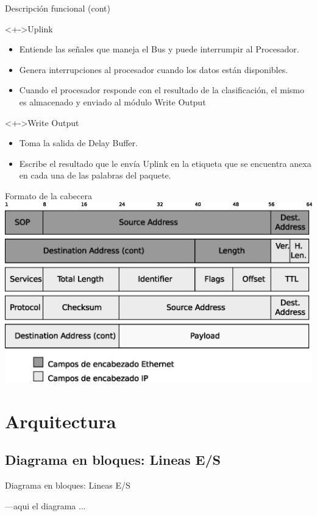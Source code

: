 \documentclass[xcolor=dvipsnames]{beamer}
\begin{document}
\begin{frame}{Descripción funcional (cont)}
  \begin{block}<+->{Uplink}   
    \begin{itemize}
      \scriptsize
     	\item Entiende las señales que maneja el Bus y puede interrumpir al Procesador.
	\item Genera interrupciones al procesador cuando los datos están disponibles.
	\item Cuando el procesador responde con el resultado de la clasificación, el mismo es almacenado y enviado al módulo Write Output
    \end{itemize}
  \end{block}
\begin{block}<+->{Write Output}   
    \begin{itemize}
      \scriptsize
     	\item Toma la salida de Delay Buffer.
	\item Escribe el resultado que le envía Uplink en la etiqueta que se encuentra anexa en cada una de las palabras del paquete.
    \end{itemize}
  \end{block}
\end{frame}
\begin{frame}{Formato de la cabecera}
 \center 
\includegraphics[scale=0.55]{figures/cabecera.eps}
\end{frame}

\section{Arquitectura}
\subsection{Diagrama en bloques: Lineas E/S}
\begin{frame}{Diagrama en bloques: Lineas E/S}

---aqui el diagrama ...

\end{frame}
\end{document}
